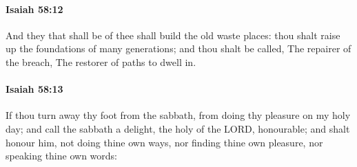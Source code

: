 		\paragraph{Isaiah 58:12} %
			\label{ISAIAH-58-12}

			And they that shall be of thee shall build the old waste places: thou shalt raise up the foundations of many generations; and thou shalt be called, The repairer of the breach, The restorer of paths to dwell in.


		\paragraph{Isaiah 58:13} %
			\label{ISAIAH-58-13}

			If thou turn away thy foot from the sabbath, from doing thy pleasure on my holy day; and call the sabbath a delight, the holy of the LORD, honourable; and shalt honour him, not doing thine own ways, nor finding thine own pleasure, nor speaking thine own words:

